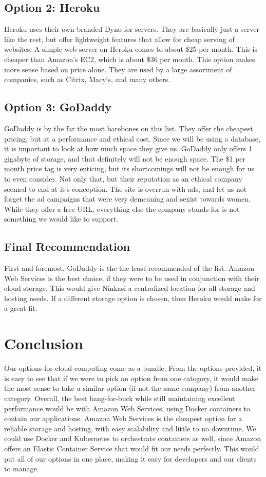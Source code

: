 \documentclass[10pt, draftclsnofoot, journal, onecolumn]{IEEEtran}
\begin{document}
    \subsection{Option 2: Heroku}
        Heroku uses their own branded Dyno for servers. They are basically just a server like the rest, but offer lightweight features that allow for cheap serving of websites. A simple web server on Heroku comes to about \$25 per month. This is cheaper than Amazon's EC2, which is about \$36 per month. This option makes more sense based on price alone. They are used by a large assortment of companies, such as Citrix, Macy`s, and many others. \cite{heroku} 
            
    \subsection{Option 3: GoDaddy}
        GoDaddy is by the far the most barebones on this list. They offer the cheapest pricing, but at a performance and ethical cost. Since we will be using a database, it is important to look at how much space they give us. GoDaddy only offers 1 gigabyte of storage, and that definitely will not be enough space. The \$1 per month price tag is very enticing, but its shortcomings will not be enough for us to even consider. Not only that, but their reputation as an ethical company seemed to end at it's conception. The site is overrun with ads, and let us not forget the ad campaigns that were very demeaning and sexist towards women. While they offer a free URL, \cite{godaddy} everything else the company stands for is not something we would like to support.
        
        \subsection{Final Recommendation} 
            First and foremost, GoDaddy is the the least-recommended of the list. Amazon Web Services is the best choice, if they were to be used in conjunction with their cloud storage. This would give Ninkasi a centralized location for all storage and hosting needs. If a different storage option is chosen, then Heroku would make for a great fit. 
        
        \section{Conclusion}
            Our options for cloud computing come as a bundle. From the options provided, it is easy to see that if we were to pick an option from one category, it would make the most sense to take a similar option (if not the same company) from another category. Overall, the best bang-for-buck while still maintaining excellent performance would be with Amazon Web Services, using Docker containers to contain our applications. Amazon Web Services is the cheapest option for a reliable storage and hosting, with easy scalability and little to no downtime. We could use Docker and Kubernetes to orchestrate containers as well, since Amazon offers an Elastic Container Service that would fit our needs perfectly. \cite{elastickub} This would put all of our options in one place, making it easy for developers and our clients to manage.
        
\end{document}
